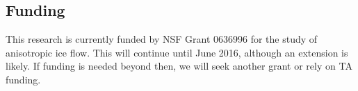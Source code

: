 \documentclass{article}
\begin{document}
\subsection{Funding}
This research is currently funded by NSF Grant 0636996 for the study of anisotropic ice flow. This will continue until June 2016, although an extension is likely. If funding is needed beyond then, we will seek another grant or rely on TA funding. 



\end{document}
